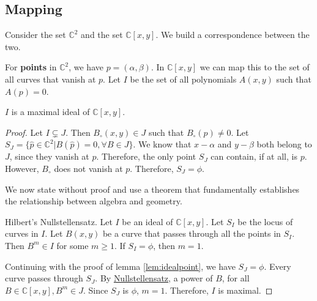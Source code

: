 \subsection{Mapping}
Consider the set $\mathbb{C}^{2}$ and the set $\mathbb{C}[x, y]$.
We build a correspondence between the two.
\par
For \textbf{points} in $\mathbb{C}^{2}$, we have $p = ( \alpha, \beta )$.
In $\mathbb{C}[x, y]$ we can map this to the set of all curves that vanish at $p$.
Let $I$ be the set of all polynomials $A(x, y)$ such that $A(p) = 0$.
\begin{lemma} \label{lem:idealpoint}
  $I$ is a maximal ideal of $\mathbb{C}[x, y]$.
\end{lemma}
\begin{proof} \label{proof:idealpoint}
  Let $I \subsetneq J$.
  Then $B_{\circ}(x, y) \in J$ such that $B_{\circ}(p) \neq 0$.
  Let $S_{J} = \{ \widehat{p} \in \mathbb{C}^{2} | B(\widehat{p}) = 0, \forall B \in J \}$.
  We know that $x - \alpha$ and $y - \beta$ both belong to $J$, since they vanish at $p$.
  Therefore, the only point $S_{J}$ can contain, if at all, is $p$.
  However, $B_{\circ}$ does not vanish at $p$.
  Therefore, $S_{J} = \phi$.
  \par
  We now state without proof and use a theorem that fundamentally establishes the relationship between algebra and geometry.
  \par
  \begin{theorem} \label{theorem:nullstellensatz}
    Hilbert's Nullstellensatz.
    Let $I$ be an ideal of $\mathbb{C}[x, y]$.
    Let $S_{I}$ be the locus of curves in $I$.
    Let $B(x, y)$ be a curve that passes through all the points in $S_{I}$.
    Then $B^{m} \in I$ for some $m \geq 1$.
    If $S_{I} = \phi$, then $m = 1$.
  \end{theorem}
  Continuing with the proof of lemma \ref{lem:idealpoint}, we have $S_{J} = \phi$.
  Every curve passes through $S_{J}$.
  By \hyperref[theorem:nullstellensatz]{Nullstellensatz}, a power of $B$, for all $B \in \mathbb{C}[x ,y], B^{m} \in J$.
  Since $S_{J}$ is $\phi$, $m = 1$.
  Therefore, $I$ is maximal.
\end{proof}

